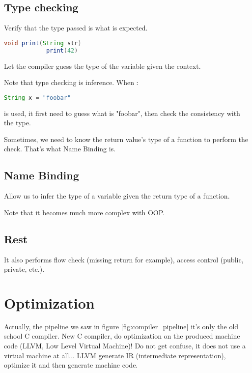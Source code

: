     \subsection{Type checking}
    \theoremstyle{definition}
    \begin{definition}
        Verify that the type passed is what is expected.
        \begin{lstlisting}[language=Java]
            void print(String str)
            print(42)
        \end{lstlisting}
    \end{definition}
    \theoremstyle{definition}
    \begin{definition}
        Let the compiler guess the type of the variable given the context.
    \end{definition}
    Note that type checking is inference. When :
    \begin{lstlisting}[language=Java]
        String x = "foobar"
    \end{lstlisting}
    is used, it
    first need to guess what is "foobar", then check the consistency with the type.

    Sometimes, we need to know the return value's type of a function to perform
    the check. That's what Name Binding is.
    \subsection{Name Binding}
        \theoremstyle{definition}
        \begin{definition}
            Allow us to infer the type of a variable given the return type of a function.
        \end{definition}
        Note that it becomes much more complex with OOP.
    \subsection{Rest}
        It also performs flow check (missing return for example), access control
        (public, private, etc.).
\section{Optimization}
    Actually, the pipeline we saw in figure \ref{fig:compiler_pipeline} it's
    only the old school C compiler. New C compiler, do optimization on the
    produced machine code (LLVM, Low Level Virtual Machine)! Do not get confuse,
    it does not use a virtual machine at all... LLVM generate IR (intermediate
    representation), optimize it and then generate machine code.

